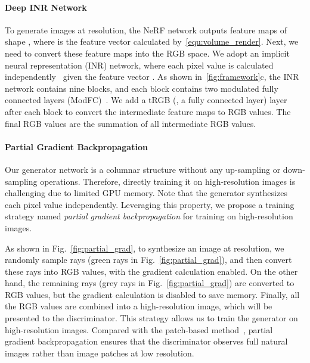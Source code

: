 \documentclass[10pt,twocolumn,letterpaper]{article}
\begin{document}
\paragraph{Deep INR Network}
To generate images at  resolution, the NeRF network outputs feature maps of shape , where  is the feature vector calculated by~\cref{equ:volume_render}. Next, we need to convert these feature maps into the RGB space. We adopt an implicit neural representation (INR) network, where each pixel value is calculated independently~\cite{anokhin2021Image} given the feature vector . As shown in~\cref{fig:framework}c, the INR network contains nine blocks, and each block contains two modulated fully connected layers (ModFC)~\cite{karras2019Analyzing,anokhin2021Image}. We add a tRGB (\ie, a fully connected layer) layer after each block to convert the intermediate feature maps to RGB values. The final RGB values are the summation of all intermediate RGB values.


\paragraph{Partial Gradient Backpropagation}
\label{sec:partial_gradient}
Our generator network is a columnar structure without any up-sampling or down-sampling operations. Therefore, directly training it on high-resolution images is challenging due to limited GPU memory. Note that the generator synthesizes each pixel value independently. Leveraging this property, we propose a training strategy named \textit{partial gradient backpropagation} for training on high-resolution images.

As shown in Fig.~\ref{fig:partial_grad}, to synthesize an image at  resolution, we randomly sample  rays (green rays in Fig.~\ref{fig:partial_grad}), and then convert these rays into  RGB values, with the gradient calculation enabled. On the other hand, the remaining  rays (grey rays in Fig.~\ref{fig:partial_grad}) are converted to RGB values, but the gradient calculation is disabled to save memory. Finally, all the RGB values are combined into a high-resolution image, which will be presented to the discriminator. This strategy allows us to train the generator on high-resolution images. Compared with the patch-based method~\cite{schwarz2020GRAF,anokhin2021Image}, partial gradient backpropagation ensures that the discriminator observes full natural images rather than image patches at low resolution.
\end{document}
